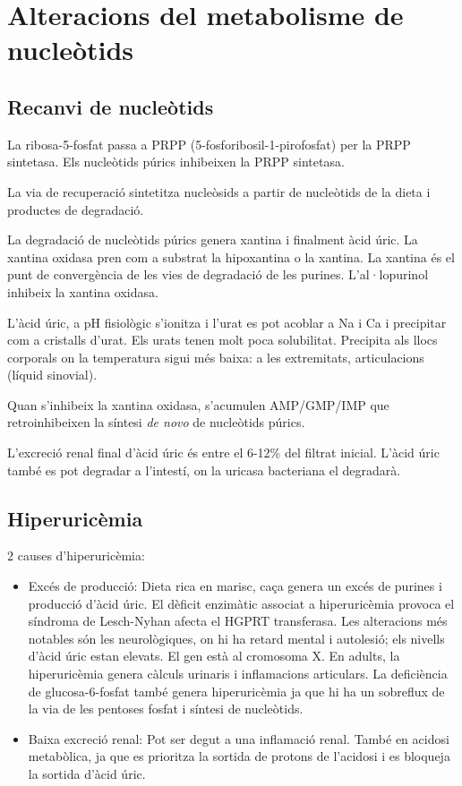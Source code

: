 \section{Alteracions del metabolisme de nucleòtids}
\label{sec:alter-del-metab}

\subsection{Recanvi de nucleòtids}
\label{sec:recanvi-de-nucl}
La ribosa-5-fosfat passa a PRPP (5-fosforibosil-1-pirofosfat) per la PRPP sintetasa. Els nucleòtids púrics inhibeixen la PRPP sintetasa.

La via de recuperació sintetitza nucleòsids a partir de nucleòtids de la dieta i productes de degradació.

La degradació de nucleòtids púrics genera xantina i finalment àcid úric. La xantina oxidasa pren com a substrat la hipoxantina o la xantina. La xantina és el punt de convergència de les vies de degradació de les purines. L'al·lopurinol inhibeix la xantina oxidasa. 

L'àcid úric, a pH fisiològic s'ionitza i l'urat es pot acoblar a Na i Ca i precipitar com a cristalls d'urat. Els urats tenen molt poca solubilitat. Precipita als llocs corporals on la temperatura sigui més baixa: a les extremitats, articulacions (líquid sinovial).

Quan s'inhibeix la xantina oxidasa, s'acumulen AMP/GMP/IMP que retroinhibeixen la síntesi \textit{de novo} de nucleòtids púrics.

L'excreció renal final d'àcid úric és entre el 6-12\% del filtrat inicial. L'àcid úric també es pot degradar a l'intestí, on la uricasa bacteriana el degradarà.

\subsection{Hiperuricèmia}
\label{sec:hiperuricemia}
2 causes d'hiperuricèmia:
\begin{itemize}
\item Excés de producció: Dieta rica en marisc, caça genera un excés de purines i producció d'àcid úric. El dèficit enzimàtic associat a hiperuricèmia provoca el síndroma de Lesch-Nyhan afecta el HGPRT transferasa. Les alteracions més notables són les neurològiques, on hi ha retard mental i autolesió; els nivells d'àcid úric estan elevats. El gen està al cromosoma X. En adults, la hiperuricèmia genera càlculs urinaris i inflamacions articulars. La deficiència de glucosa-6-fosfat també genera hiperuricèmia ja que hi ha un sobreflux de la via de les pentoses fosfat i síntesi de nucleòtids.

\item Baixa excreció renal: Pot ser degut a una inflamació renal. També en acidosi metabòlica, ja que es prioritza la sortida de protons de l'acidosi i es bloqueja la sortida d'àcid úric.
\end{itemize}

